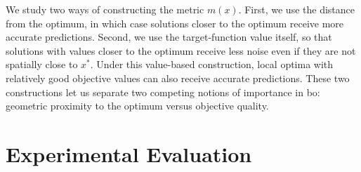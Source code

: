 We study two ways of constructing the metric $m(x)$. First, we use the distance from the optimum, in which case solutions closer to the optimum receive more accurate predictions. Second, we use the target-function value itself, so that solutions with values closer to the optimum receive less noise even if they are not spatially close to $x^*$. Under this value-based construction, local optima with relatively good objective values can also receive accurate predictions.
These two constructions let us separate two competing notions of importance in \gls{bo}: geometric proximity to the optimum versus objective quality. 


\section{Experimental Evaluation}
